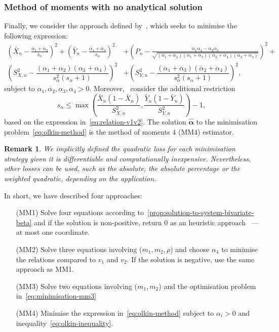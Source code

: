 \documentclass[a4paper, notitlepage, 10pt]{article}
\newtheorem{remark}{Remark}[]
\theoremstyle{definition}
\begin{document}
\subsubsection*{Method of moments with no analytical solution}

Finally, we consider the approach defined by~\cite{olkin2015constructions}, which seeks to minimise the following expression: 
\begin{equation}
    \label{eq:olkin-method}
    \begin{split}
    {\left(\bar{X}_n - \frac{\alpha_1 + \alpha_2}{s_{\alpha}}\right)}^2 + {\left(\bar{Y}_n - \frac{\alpha_1 + \alpha_3}{s_{\alpha}}\right)}^2 &+ {\left(P_n - \frac{\alpha_1 \alpha_4 - \alpha_2 \alpha_3}{\sqrt{(\alpha_1 + \alpha_2)(\alpha_1 + \alpha_3)(\alpha_2 + \alpha_4)(\alpha_3 + \alpha_4)}}\right)}^2 +\\
    {\left(S_{X,n}^2 - \dfrac{(\alpha_1+\alpha_2)(\alpha_3+\alpha_4)}{s_{\alpha}^2(s_{\alpha}+1)}\right)}^2 &+ {\left(S_{Y,n}^2 - \dfrac{(\alpha_1+\alpha_3)(\alpha_2+\alpha_4)}{s_{\alpha}^2(s_{\alpha}+1)}\right)}^2,
    \end{split}
\end{equation}
subject to $\alpha_1, \alpha_2, \alpha_3, \alpha_4 > 0$. 
Moreover,~\cite{olkin2015constructions} consider the additional restriction 
\begin{equation}
    \label{eq:olkin-inequality}
    s_{\alpha} \le \max\left(\frac{\bar{X}_n(1-\bar{X}_n)}{S_{X,n}^2},  \frac{\bar{Y}_n(1-\bar{Y}_n)}{S_{Y,n}^2}\right)-1,
\end{equation}
based on the expression in~\eqref{eq:relation-v1v2}. 
The solution $\hat{\boldsymbol{\alpha}}$ to the minimisation problem~\eqref{eq:olkin-method} is the method of moments 4 (MM4) estimator.

\begin{remark}
    We implicitly defined the quadratic loss for each minimisation strategy given it is differentiable and computationally inexpensive.
    Nevertheless, other losses can be used, such as the absolute, the absolute percentage or the weighted quadratic, depending on the application.
\end{remark}

In short, we have described four approaches: 

\begin{enumerate}
    \item[(MM1)] Solve four equations according to~\autoref{prop:solution-to-system-bivariate-beta} and if the solution is non-positive, return $0$ as an heuristic approach~\citep{arnold2011flexible} --- at most one coordinate.
    \item[(MM2)] Solve three equations involving ($m_1, m_2, \rho$) and choose $\alpha_4$ to minimise the relations compared to $v_1$ and $v_2$.
    If the solution is negative, use the same approach as MM1. 
    \item[(MM3)] Solve two equations involving ($m_1, m_2$) and the optimisation problem in~\eqref{eq:minimisation-mm3}
    \item[(MM4)] Minimise the expression in~\eqref{eq:olkin-method} subject to $\alpha_i > 0$ and inequality~\eqref{eq:olkin-inequality}.
\end{enumerate}
\end{document}
